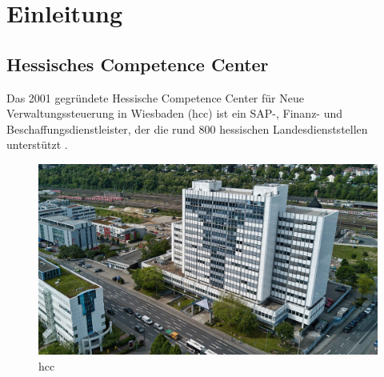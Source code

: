 \documentclass[
    12pt,
    a4paper
]{article}
\begin{document}
\clearpage


\tableofcontents

\clearpage

\glsfindwidesttoplevelname
\printglossary[
    type=\acronymtype,
    title=Abkürzungsverzeichnis,
    toctitle=Abkürzungsverzeichnis
]

\clearpage

\listoffigures

\clearpage


\section{Einleitung}
\subsection{Hessisches Competence Center}
Das 2001 gegründete Hessische Competence Center für Neue Verwaltungssteuerung in Wiesbaden (\acrshort{hcc}) ist ein SAP-,
Finanz- und Beschaffungsdienstleister,
der die rund 800 hessischen Landesdienststellen unterstützt \cite{hcc-ueber-uns}.

\begin{figure}[H]
    \centering
    \includegraphics[width=\textwidth]{hcc.jpg}
    \caption{\acrlong{hcc}}
\end{figure}

\clearpage


\setcounter{page}{4}
\end{document}
